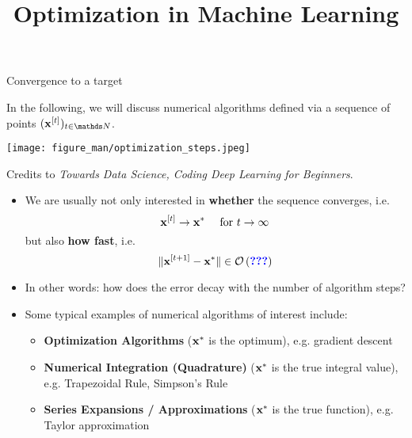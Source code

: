 \documentclass[11pt,compress,t,notes=noshow, xcolor=table]{beamer}
\title{Optimization in Machine Learning}
\begin{document}
\begin{vbframe}{Convergence to a target}

In the following, we will discuss numerical algorithms defined via a sequence of points $(\xv^{[t]})_{t \in\N}$. 


\begin{center}
  \texttt{[image: figure\_man/optimization\_steps.jpeg]} \\
  \begin{footnotesize}
    Credits to \emph{Towards Data Science, Coding Deep Learning for Beginners}.
  \end{footnotesize}
\end{center}

\framebreak 




\lz


\begin{itemize}
  \item We are usually not only interested in \textbf{whether} the sequence converges, i.e.
  $$
  \mathbf{x}^{[t]} \to \mathbf{x}^\ast \quad \text{ for } t \to \infty
  $$
  but also \textbf{how fast}, i.e. $$
  \|\mathbf{x}^{[t+1]}- \mathbf{x}^\ast\|\in\mathcal{O}\left(\textcolor{blue}{\textbf{???}}\right)
  $$
  \item In other words: how does the error decay with the number of algorithm steps? 
  \item Some typical examples of numerical algorithms of interest include:\begin{itemize}
      \item \textbf{Optimization Algorithms} ($\mathbf{x}^\ast$ is the optimum), e.g. gradient descent
      \item \textbf{Numerical Integration (Quadrature)} ($\mathbf{x}^\ast$ is the true integral value), e.g. Trapezoidal Rule, Simpson's Rule
      \item \textbf{Series Expansions / Approximations} ($\mathbf{x}^\ast$ is the true function), e.g. Taylor approximation
  \end{itemize}
\end{itemize}




\end{vbframe}
\end{document}
